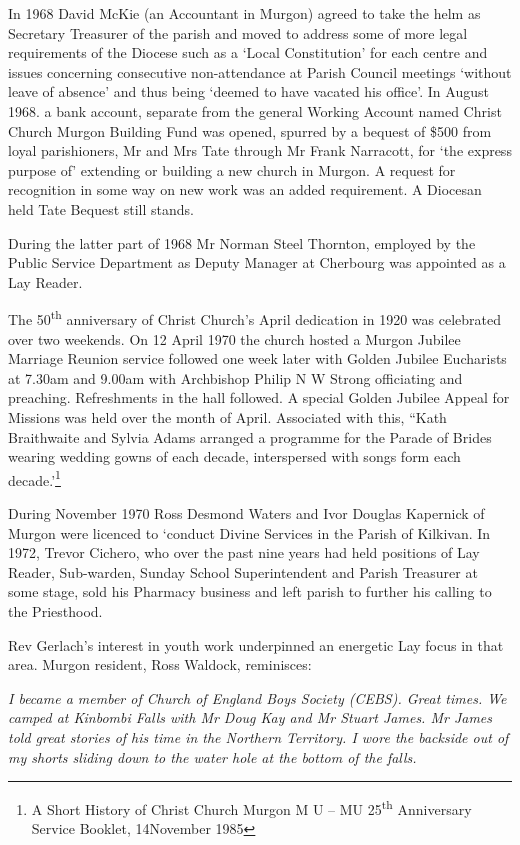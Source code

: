 In 1968 David McKie (an Accountant in Murgon) agreed to take the helm as Secretary Treasurer of the parish and moved to address some of more legal requirements of the Diocese such as a `Local Constitution' for each centre and issues concerning consecutive non-attendance at Parish Council meetings `without leave of absence' and thus being `deemed to have vacated his office'. In August 1968. a bank account, separate from the general Working Account named Christ Church Murgon Building Fund was opened, spurred by a bequest of \$500 from loyal parishioners, Mr and Mrs Tate through Mr Frank Narracott, for `the express purpose of' extending or building a new church in Murgon. A request for recognition in some way on new work was an added requirement. A Diocesan held Tate Bequest still stands.

During the latter part of 1968 Mr Norman Steel Thornton, employed by the Public Service Department as Deputy Manager at Cherbourg was appointed as a Lay Reader.

The 50\textsuperscript{th} anniversary of Christ Church's April dedication in 1920 was celebrated over two weekends. On 12 April 1970 the church hosted a Murgon Jubilee Marriage Reunion service followed one week later with Golden Jubilee Eucharists at 7.30am and 9.00am with Archbishop Philip N W Strong officiating and preaching. Refreshments in the hall followed. A special Golden Jubilee Appeal for Missions was held over the month of April. Associated with this, ``Kath Braithwaite and Sylvia Adams arranged a programme for the Parade of Brides wearing wedding gowns of each decade, interspersed with songs form each decade.'\footnote{A Short History of Christ Church Murgon M U -- MU 25\textsuperscript{th} Anniversary Service Booklet, 14November 1985}

During November 1970 Ross Desmond Waters and Ivor Douglas Kapernick of Murgon were licenced to `conduct Divine Services in the Parish of Kilkivan. In 1972, Trevor Cichero, who over the past nine years had held positions of Lay Reader, Sub-warden, Sunday School Superintendent and Parish Treasurer at some stage, sold his Pharmacy business and left parish to further his calling to the Priesthood.

Rev Gerlach's interest in youth work underpinned an energetic Lay focus in that area. Murgon resident, Ross Waldock, reminisces:

\emph{I became a member of Church of England Boys Society (CEBS). Great times. We camped at Kinbombi Falls with Mr Doug Kay and Mr Stuart James. Mr James told great stories of his time in the Northern Territory. I wore the backside out of my shorts sliding down to the water hole at the bottom of the falls.}

